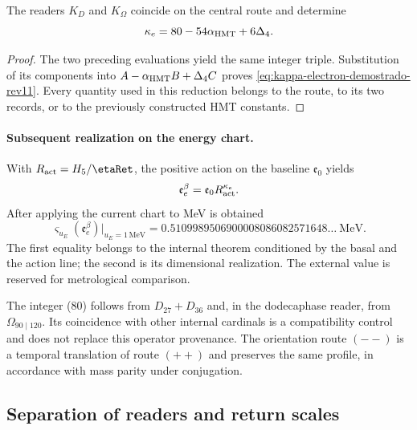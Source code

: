 \begin{theorem}
\label{thm:reduccion-electron-two-way-rev11}
The readers \(K_D\) and \(K_\Omega\) coincide on the central route and
determine
\begin{equation}
 \kappa_e=80-54\alpha_{\rm HMT}+6\Delta_4.
 \label{eq:kappa-electron-demostrado-rev11}
\end{equation}
\end{theorem}

\begin{proof}
The two preceding evaluations yield the same integer triple. Substitution
of its components into
\(A-\alpha_{\rm HMT}B+\Delta_4C\) proves
\eqref{eq:kappa-electron-demostrado-rev11}. Every quantity used in this
reduction belongs to the route, to its two records, or to the previously
constructed HMT constants.
\end{proof}

\paragraph{Subsequent realization on the energy chart.}
With \(R_{\rm act}=H_5/\etaRet\), the positive action on the baseline
\(\mathfrak e_0\) yields
\begin{equation}
 \mathfrak e_e^\beta
 =\mathfrak e_0R_{\rm act}^{\kappa_e}.
 \label{eq:masa-electron-adimensional-two-way-rev11}
\end{equation}
After applying the current chart to MeV is obtained
\begin{equation}
 \varsigma_{u_E}(\mathfrak e_e^\beta)\big|_{u_E=1\,\mathrm{MeV}}
 =0.5109989506900008086082571648\ldots\ \mathrm{MeV}.
 \label{eq:masa-electron-two-way-rev11}
\end{equation}
The first equality belongs to the internal theorem conditioned by the basal and
the action line; the second is its dimensional realization. The external
value is reserved for metrological comparison.

The integer (80) follows from \(D_{27}+D_{36}\) and, in the dodecaphase reader,
from \(\Omega_{90\mid120}\). Its coincidence with other internal cardinals is
a compatibility control and does not replace this operator provenance. The
orientation route \((--)\) is a temporal translation of route \((++)\)
and preserves the same profile, in accordance with mass parity under conjugation.

\subsection{Separation of readers and return scales}

